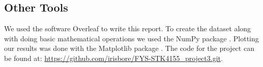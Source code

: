\subsection{Other Tools}

We used the software Overleaf to write this report. To create the dataset along with doing basic mathematical operations we used the NumPy package \cite{harris2020numpy}. Plotting our results was done with the Matplotlib package \cite{hunter-2007matplotlib}. The code for the project can be found at: \url{https://github.com/irisbore/FYS-STK4155_project3.git}.
